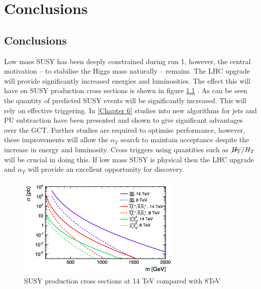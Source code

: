 
\chapter{Conclusions} %

\label{Chapter6} %



\section{Conclusions}
Low mass SUSY has been deeply constrained during run 1, however, the central motivation -- to stabilise the Higgs mass naturally -- remains. The LHC upgrade will provide significantly increased energies and luminosities. The effect this will have on SUSY production cross sections is shown in figure \ref{snow} \cite{ProjectedCx}. As can be seen the quantity of predicted SUSY events will be significantly increased. This will rely on effective triggering. In \ref{Chapter 6} studies into new algorithms for jets and PU subtraction have been presented and shown to give significant advantages over the GCT. Further studies are required to optimise performance, however, these improvements will allow the $\alpha_T$ search to maintain acceptance despite the increase in energy and luminosity. Cross triggers using quantities such as $\cancel{H_T}/{H_T}$ will be crucial in doing this. If low mass SUSY is physical then the LHC upgrade and $\alpha_T$ will provide an excellent opportunity for discovery. 
\begin{figure}
\centering
    \includegraphics[width=0.7\textwidth]{Figures/snowmass.png}
  \caption{SUSY production cross sections at 14 TeV compared with 8TeV}
  \label{snow}
\end{figure}


